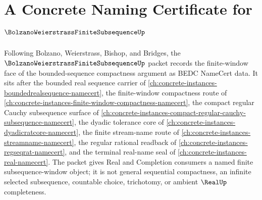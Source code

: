 \chapter{A Concrete Naming Certificate for $\BolzanoWeierstrassFiniteSubsequenceUp$}
\label{ch:concrete-instances-bolzano-weierstrass-finite-subsequence-namecert}

Following Bolzano, Weierstrass, Bishop, and Bridges, the $\BolzanoWeierstrassFiniteSubsequenceUp$ packet records the finite-window face of the bounded-sequence compactness argument as BEDC NameCert data. It sits after the bounded real sequence carrier of \autoref{ch:concrete-instances-boundedrealsequence-namecert}, the finite-window compactness route of \autoref{ch:concrete-instances-finite-window-compactness-namecert}, the compact regular Cauchy subsequence surface of \autoref{ch:concrete-instances-compact-regular-cauchy-subsequence-namecert}, the dyadic tolerance core of \autoref{ch:concrete-instances-dyadicratcore-namecert}, the finite stream-name route of \autoref{ch:concrete-instances-streamname-namecert}, the regular rational readback of \autoref{ch:concrete-instances-regseqrat-namecert}, and the terminal real-name seal of \autoref{ch:concrete-instances-real-namecert}. The packet gives Real and Completion consumers a named finite subsequence-window object; it is not general sequential compactness, an infinite selected subsequence, countable choice, trichotomy, or ambient $\RealUp$ completeness.

